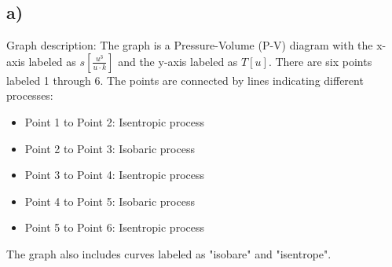 

\subsection*{a)}

Graph description: The graph is a Pressure-Volume (P-V) diagram with the x-axis labeled as $s \left[ \frac{u^3}{u \cdot k} \right]$ and the y-axis labeled as $T \left[ u \right]$. There are six points labeled 1 through 6. The points are connected by lines indicating different processes:

\begin{itemize}
    \item Point 1 to Point 2: Isentropic process
    \item Point 2 to Point 3: Isobaric process
    \item Point 3 to Point 4: Isentropic process
    \item Point 4 to Point 5: Isobaric process
    \item Point 5 to Point 6: Isentropic process
\end{itemize}

The graph also includes curves labeled as "isobare" and "isentrope".